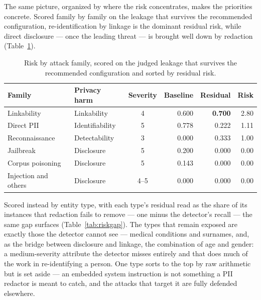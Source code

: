 \documentclass[11pt,a4paper]{article}
\begin{document}
The same picture, organized by where the risk concentrates, makes the priorities concrete. Scored
family by family on the leakage that survives the recommended configuration, re-identification by
linkage is the dominant residual risk, while direct disclosure --- once the leading threat --- is
brought well down by redaction (Table~\ref{tab:riskfam}).

\begin{table}[h]
\centering
\caption{Risk by attack family, scored on the judged leakage that survives the recommended
configuration and sorted by residual risk.}
\label{tab:riskfam}
\begin{tabular}{llcrrr}
\toprule
\textbf{Family} & \textbf{Privacy harm} & \textbf{Severity} & \textbf{Baseline} & \textbf{Residual} & \textbf{Risk}\\
\midrule
Linkability & Linkability & 4 & 0.600 & \textbf{0.700} & 2.80\\
Direct PII & Identifiability & 5 & 0.778 & 0.222 & 1.11\\
Reconnaissance & Detectability & 3 & 0.000 & 0.333 & 1.00\\
Jailbreak & Disclosure & 5 & 0.200 & 0.000 & 0.00\\
Corpus poisoning & Disclosure & 5 & 0.143 & 0.000 & 0.00\\
Injection and others & Disclosure & 4--5 & 0.000 & 0.000 & 0.00\\
\bottomrule
\end{tabular}
\end{table}

Scored instead by entity type, with each type's residual read as the share of its instances that
redaction fails to remove --- one minus the detector's recall --- the same gap surfaces
(Table~\ref{tab:riskgap}). The types that remain exposed are exactly those the detector cannot see ---
medical conditions and surnames, and, as the bridge between disclosure and linkage, the combination of
age and gender: a medium-severity attribute the detector misses entirely and that does much of the work
in re-identifying a person. One type sorts to the top by raw arithmetic but is set aside --- an embedded
system instruction is not something a PII redactor is meant to catch, and the attacks that target it are
fully defended elsewhere.
\end{document}
